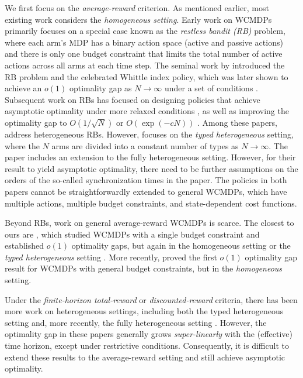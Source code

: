 \documentclass{article}
\theoremstyle{plain}
\theoremstyle{remark}
\begin{document}
We first focus on the \emph{average-reward} criterion.
As mentioned earlier, most existing work considers the \emph{homogeneous setting}.
Early work on WCMDPs primarily focuses on a special case known as the \emph{restless bandit (RB)} problem, where each arm's MDP has a binary action space (active and passive actions) and there is only one budget constraint that limits the total number of active actions across all arms at each time step.
The seminal work by \citet{Whi_88_rb} introduced the RB problem and the celebrated Whittle index policy, which was later shown to achieve an $o(1)$ optimality gap as $N\to\infty$ under a set of conditions \citep{WebWei_90}.
Subsequent work on RBs has focused on designing policies that achieve asymptotic optimality under more relaxed conditions \citep{Ver_16_verloop,HonXieChe_23,HonXieChe_24,Yan_24}, as well as improving the optimality gap to $O(1/\sqrt{N})$ \citep{HonXieChe_23,HonXieChe_24} or $O(\exp(-cN))$ \citep{GasGauYan_23_exponential,GasGauYan_23_whittles,hong2024exponential}.
Among these papers, \citep{Ver_16_verloop,HonXieChe_23} address heterogeneous RBs. However, \citep{Ver_16_verloop} focuses on the \emph{typed heterogeneous} setting, where the $N$ arms are divided into a constant number of types as $N\to\infty$.  
The paper \citep{HonXieChe_23} includes an extension to the fully heterogeneous setting.
However, for their result to yield asymptotic optimality, there need to be further assumptions on the orders of the so-called synchronization times in the paper.
The policies in both papers cannot be straightforwardly extended to general WCMDPs, which have multiple actions, multiple budget constraints, and state-dependent cost functions. 


Beyond RBs, work on general average-reward WCMDPs is scarce.
The closest to ours are \citep{HodGla_15, Ver_16_verloop,XioWanLi_22}, which studied WCMDPs with a single budget constraint and established $o(1)$ optimality gaps, but again in the homogeneous setting \citep{HodGla_15} or the \emph{typed heterogeneous} setting \citep{Ver_16_verloop,XioWanLi_22}. 
More recently, \citep{GolAvr_24_wcmdp_multichain} proved the first $o(1)$ optimality gap result for WCMDPs with general budget constraints, but in the \emph{homogeneous} setting.


Under the \emph{finite-horizon total-reward} or \emph{discounted-reward} criteria, there has been more work on heterogeneous settings, including both the typed heterogeneous setting \citep{DaeChoGri_23,GhoNagJaiTam_23_finite_discount} and, more recently, the fully heterogeneous setting \citep{BroSmi_19_rb,BroZha_22,BroZha_23,Zhang24_het}.
However, the optimality gap in these papers generally grows \emph{super-linearly} with the (effective) time horizon, except under restrictive conditions.
Consequently, it is difficult to extend these results to the average-reward setting and still achieve asymptotic optimality.
\end{document}
